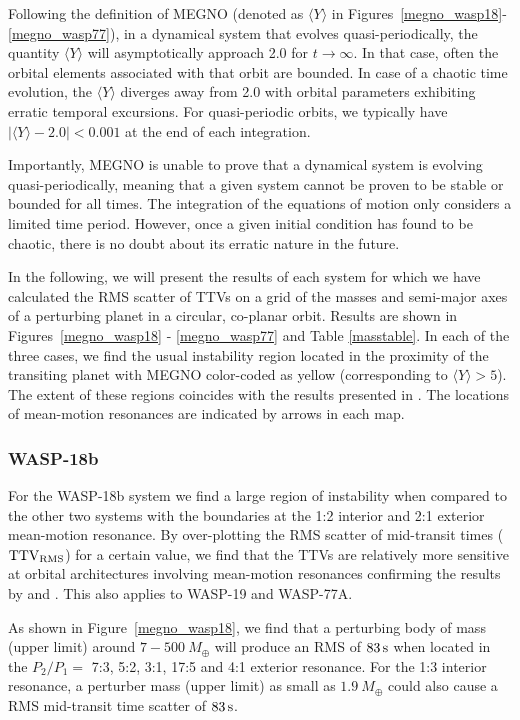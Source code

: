 Following the definition of MEGNO \citep{cincsimo2000} (denoted as $\langle Y\rangle$ in Figures~\ref{megno_wasp18}-\ref{megno_wasp77}), in a dynamical system that evolves quasi-periodically, the quantity $\langle Y \rangle$ will asymptotically approach 2.0 for $t \rightarrow \infty$. In that case, often the orbital elements associated with that orbit are bounded. In case of a chaotic time evolution, the $\langle Y\rangle$ diverges away from 2.0 with orbital parameters exhibiting erratic temporal excursions. For quasi-periodic orbits, we typically have $|\langle Y \rangle - 2.0| < 0.001$ at the end of each integration.

Importantly, MEGNO is unable to prove that a dynamical system is evolving quasi-periodically, meaning that a given system cannot be proven to be stable or bounded for all times. The integration of the equations of motion only considers a limited time period. However, once a given initial condition has found to be chaotic, there is no doubt about its erratic nature in the future.

In the following, we will present the results of each system for which we have calculated the RMS scatter of TTVs on a grid of the masses and semi-major axes of a perturbing planet in a circular, co-planar orbit. Results are shown in Figures~\ref{megno_wasp18} - \ref{megno_wasp77} and Table \ref{masstable}. In each of the three cases, we find the usual instability region located in the proximity of the transiting planet with MEGNO color-coded as yellow (corresponding to $\langle Y\rangle > 5$). The extent of these regions coincides with the results presented in \citet{barnes2006}. The locations of mean-motion resonances are indicated by arrows in each map.


\subsubsection{WASP-18b}
For the WASP-18b system we find a large region of instability when
compared to the other two systems with the boundaries at the 1:2 interior
and 2:1 exterior mean-motion resonance. By over-plotting the RMS scatter
of mid-transit times ($\rm TTV_{\rm RMS}$) for a certain value, we find
that the TTVs are relatively more sensitive at orbital architectures
involving mean-motion resonances confirming the results by
\citet{Agol2005} and \citet{Holman2005}. This also applies to WASP-19 and
WASP-77A.

As shown in Figure~\ref{megno_wasp18}, we find that a perturbing body of mass (upper limit) around $7-500~M_{\oplus}$ will produce an RMS of $83\,{\rm s}$ when located in the $P_2/P_1=$ 7:3, 5:2, 3:1, 17:5 and 4:1 exterior resonance. For the 1:3 interior resonance, a perturber mass (upper limit) as small as $1.9~M_{\oplus}$ could also cause a RMS mid-transit time scatter of $83\,{\rm s}$.

